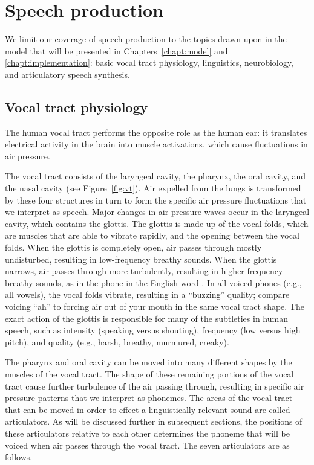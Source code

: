 \section{Speech production}

We limit our coverage
of speech production
to the topics drawn upon
in the model that will be presented
in Chapters~\ref{chapt:model}
and \ref{chapt:implementation}:
basic vocal tract physiology,
linguistics, neurobiology,
and articulatory speech synthesis.

\subsection{Vocal tract physiology}

The human vocal tract performs
the opposite role
as the human ear:
it translates electrical activity in the brain
into muscle activations,
which cause fluctuations in air pressure.


The vocal tract consists of
the laryngeal cavity,
the pharynx, the oral cavity,
and the nasal cavity
(see Figure~\ref{fig:vt}).
Air expelled from the lungs
is transformed
by these four structures
in turn to form the
specific air pressure fluctuations
that we interpret as speech.
Major changes in air pressure waves
occur in the laryngeal cavity,
which contains the glottis.
The glottis is made up of
the vocal folds,
which are muscles that are able to vibrate rapidly,
and the opening between the vocal folds.
When the glottis is completely open,
air passes through mostly undisturbed,
resulting in low-frequency breathy sounds.
When the glottis narrows,
air passes through more turbulently,
resulting in higher frequency breathy sounds,
as in the phone \ipa{[h]}
in the English word .
In all voiced phones (e.g., all vowels),
the vocal folds vibrate,
resulting in a ``buzzing'' quality;
compare voicing ``ah'' to
forcing air out of your mouth
in the same vocal tract shape.
The exact action of the glottis
is responsible for many
of the subtleties in human speech,
such as intensity (speaking versus shouting),
frequency (low versus high pitch),
and quality (e.g., harsh, breathy, murmured, creaky).

The pharynx and oral cavity
can be moved into many different shapes
by the muscles of the vocal tract.
The shape of these remaining portions
of the vocal tract cause further turbulence
of the air passing through,
resulting in specific air pressure patterns
that we interpret as phonemes.
The areas of the vocal tract
that can be moved in order to
effect a linguistically relevant sound
are called articulators.
As will be discussed further
in subsequent sections,
the positions of these articulators
relative to each other
determines the phoneme
that will be voiced
when air passes through
the vocal tract.
The seven articulators are
as follows.

